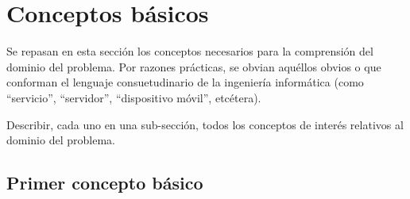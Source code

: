 \section{Conceptos básicos}
\label{sec:basicConcepts}

Se repasan en esta sección los conceptos necesarios para la comprensión del dominio del problema. Por razones prácticas, se obvian aquéllos obvios o que conforman el lenguaje consuetudinario de la ingeniería informática (como ``servicio'', ``servidor'', ``dispositivo móvil'', etcétera).

\begin{shaded}
Describir, cada uno en una sub-sección, todos los conceptos de interés relativos al dominio del problema.
\end{shaded}

\subsection*{Primer concepto básico} %
\label{sec:firstBasicConcept} %